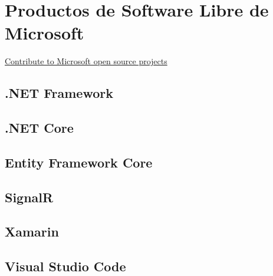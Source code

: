 \section{Productos de Software Libre de Microsoft}
\href{https://opensource.microsoft.com/explore}{Contribute to Microsoft open source projects}
\subsection{.NET Framework}
\subsection{.NET Core}
\subsection{Entity Framework Core}
\subsection{SignalR}
\subsection{Xamarin}
\subsection{Visual Studio Code}